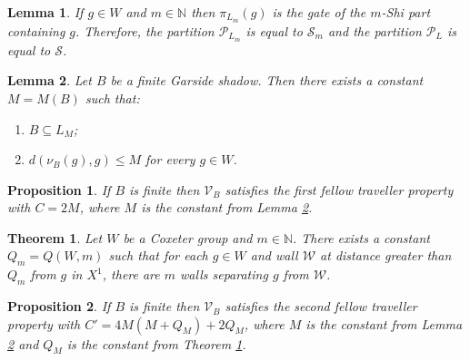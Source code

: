 \documentclass[10pt,a4paper]{amsart}
\newtheorem{lemma}{Lemma}
\newtheorem{prop}{Proposition}
\newtheorem{thm}{Theorem}
\newcommand{\N}{\mathbb{N}}
\newcommand{\V}{\mathcal{V}}
\newcommand{\W}{\mathcal{W}}
\newcommand{\vr}{\nu}
\begin{document}
\begin{lemma} \label{lem-mShi}
    If $g \in W$ and $m \in \N$ then $\pi_{L_m}(g)$ is the gate of the $m$-Shi part containing $g$. Therefore, the partition $\mathscr{P}_{L_m}$ is equal to $\mathscr{S}_m$ and the partition $\mathscr{P}_L$ is equal to $\mathscr{S}$.
\end{lemma}

\begin{lemma} \label{constM}
Let $B$ be a finite Garside shadow. Then there exists a constant $M = M(B)$ such that:
\begin{enumerate}
    \item \label{contM-1} $B \subseteq L_M$;
    \item $d(\vr_B(g), g) \leq M$ for every $g \in W$.
\end{enumerate}
\end{lemma}

\begin{prop} \label{PropFTPa}
    If $B$ is finite then $\V_B$ satisfies the first fellow traveller property with $C = 2M$, where $M$ is the constant from Lemma \ref{constM}.
\end{prop}

\begin{thm} \label{Parallel wall}
    Let $W$ be a Coxeter group and $m \in \N$. There exists a constant $Q_m = Q(W,m)$ such that for each $g \in W$ and wall $\W$ at distance greater than $Q_m$ from $g$ in $X^1$, there are $m$ walls separating $g$ from $\W$.
\end{thm}

\begin{prop} \label{propFTPb}
    If $B$ is finite then $\V_B$ satisfies the second fellow traveller property with $C' = 4M(M+Q_M)+2Q_M$, where $M$ is the constant from Lemma \ref{constM} and $Q_M$ is the constant from Theorem \ref{Parallel wall}.
\end{prop}
\end{document}
